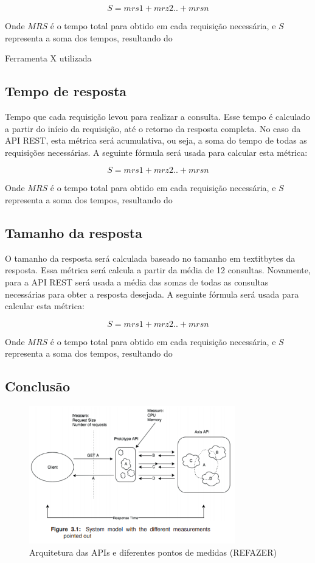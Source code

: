 $$S=mrs1+mrz2..+mrsn$$

Onde $MRS$ é o tempo total para obtido em cada requisição necessária, e $S$ representa a soma dos tempos, resultando do 

Ferramenta X utilizada

\subsection*{Tempo de resposta}

Tempo que cada requisição levou para realizar a consulta. Esse tempo é calculado a partir do início da requisição, até o retorno da resposta completa. No caso da API REST, esta métrica será acumulativa, ou seja, a soma do tempo de todas as requisições necessárias. A seguinte fórmula será usada para calcular esta métrica: 

$$S=mrs1+mrz2..+mrsn$$

Onde $MRS$ é o tempo total para obtido em cada requisição necessária, e $S$ representa a soma dos tempos, resultando do 

\subsection*{Tamanho da resposta}

O tamanho da resposta será calculada baseado no tamanho em textit{bytes} da resposta. Essa métrica será calcula a partir da média de 12 consultas. Novamente, para a API REST será usada a média das somas de todas as consultas necessárias para obter a resposta desejada. A seguinte fórmula será usada para calcular esta métrica: 

$$S=mrs1+mrz2..+mrsn$$

Onde $MRS$ é o tempo total para obtido em cada requisição necessária, e $S$ representa a soma dos tempos, resultando do 

\subsection*{Conclusão}

\begin{figure}[htbp]
\centering
\includegraphics[width=0.8\textwidth]{figuras/metricas.PNG}
\caption{Arquitetura das APIs e diferentes pontos de medidas (REFAZER)}
\label{fig:my-metrics}
\author{fonte: Autor}
\end{figure}

